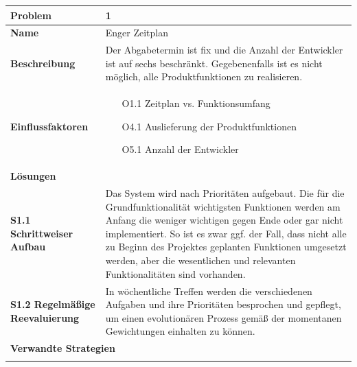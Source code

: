 \documentclass[fontsize=12pt,paper=a4,twoside]{scrartcl}
\begin{document}
\begin{tabularx}{\textwidth}{|l|X|}
 \hline
 \textbf{Problem} & 1 \\\hline
 \textbf{Name} & Enger Zeitplan \\\hline 
 \textbf{Beschreibung} & Der Abgabetermin ist fix und die Anzahl der Entwickler ist auf sechs beschränkt. Gegebenenfalls ist es nicht möglich, alle Produktfunktionen zu realisieren.\\\hline
 \textbf{Einflussfaktoren} &
 \begin{itemize}
 \item[O1.1] Zeitplan vs. Funktionsumfang
 \item[O4.1] Auslieferung der Produktfunktionen
 \item[O5.1] Anzahl der Entwickler
 \end{itemize}\\\hline
\multicolumn{2}{|l|}{\textbf{Lösungen}} \\\hline
\textbf{S1.1 Schrittweiser Aufbau} & Das System wird nach Prioritäten aufgebaut. Die für die Grundfunktionalität wichtigsten Funktionen werden am Anfang die weniger wichtigen gegen Ende oder gar nicht implementiert. So ist es zwar ggf. der Fall, dass nicht alle zu Beginn des Projektes geplanten Funktionen umgesetzt werden, aber die wesentlichen und relevanten Funktionalitäten sind vorhanden. \\

\textbf{S1.2 Regelmäßige Reevaluierung} & In wöchentliche Treffen werden die verschiedenen Aufgaben und ihre Prioritäten besprochen und gepflegt, um einen evolutionären Prozess gemäß der momentanen Gewichtungen einhalten zu können. \\\hline
 
 \multicolumn{2}{|l|}{\textbf{Verwandte Strategien}} \\\hline
  & \\\hline
\end{tabularx}
\end{document}
